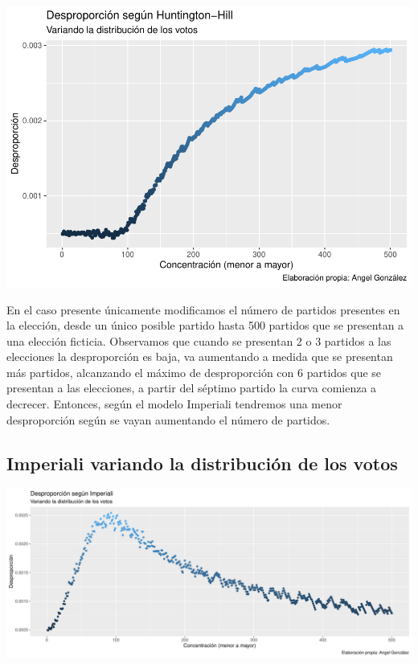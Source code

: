 \documentclass[12pt,a4paper,]{book}
\numberwithin{dummy}{section}
\theoremstyle{ocrenumbox}
\theoremstyle{blacknumex}
\theoremstyle{blacknumbox}
\theoremstyle{ocrenum}
\theoremstyle{ocrenum}
\begin{document}
\begin{center}\includegraphics[width=0.95\linewidth]{figurasR/unnamed-chunk-28-1} \end{center}

En el caso presente únicamente modificamos el número de partidos
presentes en la elección, desde un único posible partido hasta 500
partidos que se presentan a una elección ficticia. Observamos que cuando
se presentan 2 o 3 partidos a las elecciones la desproporción es baja,
va aumentando a medida que se presentan más partidos, alcanzando el
máximo de desproporción con 6 partidos que se presentan a las
elecciones, a partir del séptimo partido la curva comienza a decrecer.
Entonces, según el modelo Imperiali tendremos una menor desproporción
según se vayan aumentando el número de partidos.

\hypertarget{imperiali-variando-la-distribuciuxf3n-de-los-votos}{%
\subsection{Imperiali variando la distribución de los
votos}\label{imperiali-variando-la-distribuciuxf3n-de-los-votos}}

\begin{center}\includegraphics[width=0.95\linewidth]{figurasR/unnamed-chunk-29-1} \end{center}
\end{document}
